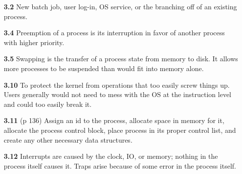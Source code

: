 \documentclass{article}
\begin{document}
\begin{enumerate}
\item[\textbf{3.2}]
New batch job, user log-in, OS service, or the branching off of an
existing process.

\item[\textbf{3.4}]
Preemption of a process is its interruption in favor of another
process with higher priority.

\item[\textbf{3.5}]
Swapping is the transfer of a process state from memory to disk. It
allows more processes to be suspended than would fit into memory alone.

\item[\textbf{3.10}]
To protect the kernel from operations that too easily screw things
up. Users generally would not need to mess with the OS at the
instruction level and could too easily break it.

\item[\textbf{3.11}]
(p 136) Assign an id to the process, allocate space in memory for it,
allocate the process control block, place process in its proper
control list, and create any other necessary data structures.

\item[\textbf{3.12}]
Interrupts are caused by the clock, IO, or memory; nothing in the
process itself causes it. Traps arise because of some error in the
process itself.

\end{enumerate}
\end{document}
